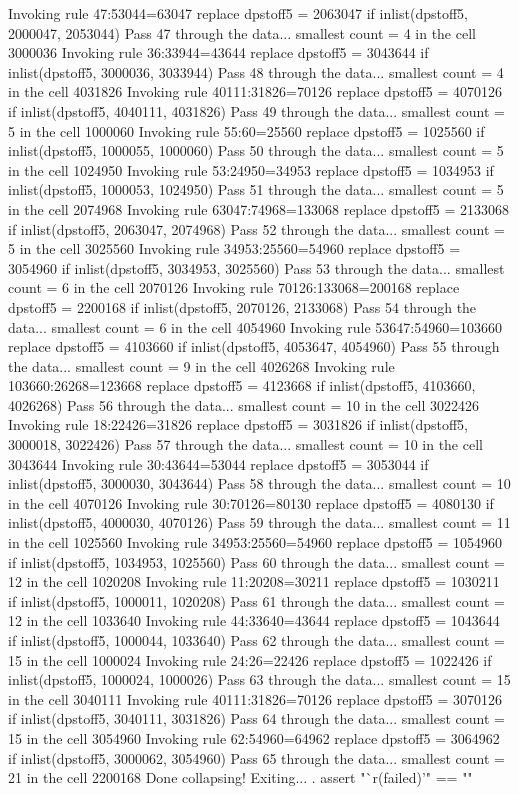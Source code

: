   Invoking rule 47:53044=63047
  replace dpstoff5 = 2063047 if inlist(dpstoff5, 2000047, 2053044)
Pass 47 through the data...
  smallest count = 4 in the cell      3000036
  Invoking rule 36:33944=43644
  replace dpstoff5 = 3043644 if inlist(dpstoff5, 3000036, 3033944)
Pass 48 through the data...
  smallest count = 4 in the cell      4031826
  Invoking rule 40111:31826=70126
  replace dpstoff5 = 4070126 if inlist(dpstoff5, 4040111, 4031826)
Pass 49 through the data...
  smallest count = 5 in the cell      1000060
  Invoking rule 55:60=25560
  replace dpstoff5 = 1025560 if inlist(dpstoff5, 1000055, 1000060)
Pass 50 through the data...
  smallest count = 5 in the cell      1024950
  Invoking rule 53:24950=34953
  replace dpstoff5 = 1034953 if inlist(dpstoff5, 1000053, 1024950)
Pass 51 through the data...
  smallest count = 5 in the cell      2074968
  Invoking rule 63047:74968=133068
  replace dpstoff5 = 2133068 if inlist(dpstoff5, 2063047, 2074968)
Pass 52 through the data...
  smallest count = 5 in the cell      3025560
  Invoking rule 34953:25560=54960
  replace dpstoff5 = 3054960 if inlist(dpstoff5, 3034953, 3025560)
Pass 53 through the data...
  smallest count = 6 in the cell      2070126
  Invoking rule 70126:133068=200168
  replace dpstoff5 = 2200168 if inlist(dpstoff5, 2070126, 2133068)
Pass 54 through the data...
  smallest count = 6 in the cell      4054960
  Invoking rule 53647:54960=103660
  replace dpstoff5 = 4103660 if inlist(dpstoff5, 4053647, 4054960)
Pass 55 through the data...
  smallest count = 9 in the cell      4026268
  Invoking rule 103660:26268=123668
  replace dpstoff5 = 4123668 if inlist(dpstoff5, 4103660, 4026268)
Pass 56 through the data...
  smallest count = 10 in the cell      3022426
  Invoking rule 18:22426=31826
  replace dpstoff5 = 3031826 if inlist(dpstoff5, 3000018, 3022426)
Pass 57 through the data...
  smallest count = 10 in the cell      3043644
  Invoking rule 30:43644=53044
  replace dpstoff5 = 3053044 if inlist(dpstoff5, 3000030, 3043644)
Pass 58 through the data...
  smallest count = 10 in the cell      4070126
  Invoking rule 30:70126=80130
  replace dpstoff5 = 4080130 if inlist(dpstoff5, 4000030, 4070126)
Pass 59 through the data...
  smallest count = 11 in the cell      1025560
  Invoking rule 34953:25560=54960
  replace dpstoff5 = 1054960 if inlist(dpstoff5, 1034953, 1025560)
Pass 60 through the data...
  smallest count = 12 in the cell      1020208
  Invoking rule 11:20208=30211
  replace dpstoff5 = 1030211 if inlist(dpstoff5, 1000011, 1020208)
Pass 61 through the data...
  smallest count = 12 in the cell      1033640
  Invoking rule 44:33640=43644
  replace dpstoff5 = 1043644 if inlist(dpstoff5, 1000044, 1033640)
Pass 62 through the data...
  smallest count = 15 in the cell      1000024
  Invoking rule 24:26=22426
  replace dpstoff5 = 1022426 if inlist(dpstoff5, 1000024, 1000026)
Pass 63 through the data...
  smallest count = 15 in the cell      3040111
  Invoking rule 40111:31826=70126
  replace dpstoff5 = 3070126 if inlist(dpstoff5, 3040111, 3031826)
Pass 64 through the data...
  smallest count = 15 in the cell      3054960
  Invoking rule 62:54960=64962
  replace dpstoff5 = 3064962 if inlist(dpstoff5, 3000062, 3054960)
Pass 65 through the data...
  smallest count = 21 in the cell      2200168
  Done collapsing! Exiting...
{\smallskip}
. assert "`r(failed)'" == ""      
{\smallskip}
